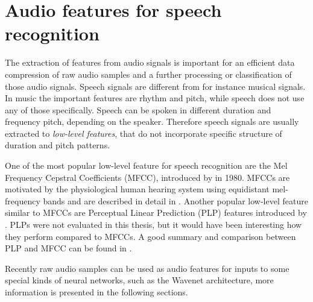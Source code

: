 
\section{Audio features for speech recognition}\label{sec:pref_features}
\thesisStateReady
The extraction of features from audio signals is important for an efficient data compression of raw audio samples and a further processing or classification of those audio signals.
Speech signals are different from for instance musical signals.
In music the important features are rhythm and pitch, while speech does not use any of those specifically.
Speech can be spoken in different duration and frequency pitch, depending on the speaker.
Therefore speech signals are usually extracted to \emph{low-level features}, that do not incorporate specific structure of duration and pitch patterns.

One of the most popular low-level feature for speech recognition are the Mel Frequency Cepstral Coefficients (MFCC), introduced by \cite{Mermelstein1980} in 1980.
MFCCs are motivated by the physiological human hearing system using equidistant mel-frequency bands and are described in detail in .
Another popular low-level feature similar to MFCCs are Perceptual Linear Prediction (PLP) features introduced by \cite{Hermansky1987}.
PLPs were not evaluated in this thesis, but it would have been interesting how they perform compared to MFCCs.
A good summary and comparison between PLP and MFCC can be found in \cite{Hoenig2005}.

Recently raw audio samples can be used as audio features for inputs to some special kinds of neural networks, such as the Wavenet architecture, more information is presented in the following sections.
